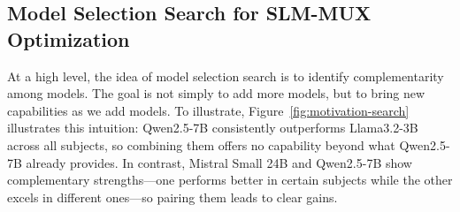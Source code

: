 \vspace{5pt}
\subsection{Model Selection Search for SLM-MUX Optimization}
\label{sub:method-search}

% 
% 
% 

At a high level, the idea of model selection search is to identify complementarity among models. The goal is not simply to add more models, but to bring new capabilities as we add models. To illustrate, Figure~\ref{fig:motivation-search} illustrates this intuition: Qwen2.5-7B consistently outperforms Llama3.2-3B across all subjects, so combining them offers no capability beyond what Qwen2.5-7B already provides. In contrast, Mistral Small 24B and Qwen2.5-7B show complementary strengths—one performs better in certain subjects while the other excels in different ones—so pairing them leads to clear gains.


